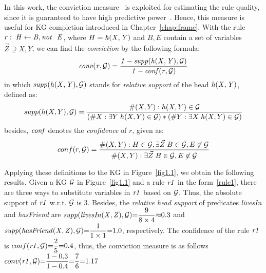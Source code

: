 In this work, the conviction measure~\cite{ref48} is exploited for estimating the rule quality, since it is guaranteed to have high predictive power~\cite{ref46}. Hence, this measure is useful for KG completion introduced in Chapter~\ref{chap:frame}. With the rule $r:\;\mi{H\leftarrow B, \naf\ E}$, where $H=\mathit{h(X,Y)}$ and $B,E$ contain a set of variables $\vec{Z}\supseteq X,Y$, we can find the \emph{conviction} by the following formula:
\vspace{-.26cm}
\begin{equation}
\mathit{conv(r, \mathcal{G})= \dfrac{1 - supp(h(X,Y), \mathcal{G})}{1 - conf(r, \mathcal{G})}}
\end{equation}
in which $\mathit{supp(h(X,Y),\mathcal{G})}$ stands for \textit{relative support} of the head $\mathit{h(X,Y)}$, defined as:
\vspace{-.28cm}
\begin{equation}
supp(h(X,Y),\mathcal{G})=\dfrac{\#(X,Y):h(X,Y)\in \mathcal{G}}{(\#X:\exists Y\;h(X,Y)\in \mathcal{G})*(\#Y:\exists X\;h(X,Y)\in \mathcal{G})}
\end{equation}
besides, $\mathit{conf}$ denotes the \textit{confidence} of $r$, given as:
\begin{equation}
conf(r,\mathcal{G})=\dfrac{\#(X,Y): H \in \mathcal{G}, \exists \vec{Z}\;B\in \mathcal{G},E \not \in \mathcal{G}}{\#(X,Y):\exists \vec{Z}\; B\in \mathcal{G}, E \not \in \mathcal{G}}
\end{equation}
\vspace{-.3cm}

\begin{example}
Applying these definitions to the KG in Figure~\ref{fig1.1}, we obtain the following results. Given a KG $\mathcal{G}$ in Figure~\ref{fig1.1} and a rule $\mathit{r1}$ in the form~\ref{rule1}, there are three ways to substitute variables in $\mathit{r1}$ based on $\mathcal{G}$. Thus, the absolute support of $\mathit{r1}$ w.r.t. $\mathcal{G}$ is $3$. Besides, the \textit{relative head support} of predicates \textit{livesIn} and \textit{hasFriend} are $\mathit{supp(livesIn(X,Z), \mathcal{G})}{=}\dfrac{9}{8 \times 4}{\approx} 0.3$ and  $\mathit{supp(hasFriend(X,Z), \mathcal{G})}{=}\dfrac{1}{1 \times 1}{=} 1.0$, respectively. The confidence of the rule $\mathit{r1}$ is $conf(\mathit{r1}, \mathcal{G}) {=} \dfrac{2}{5} {=} 0.4$, thus, the conviction measure is as follows $conv(\mathit{r1}, \mathcal{G}) {=} \dfrac{1-0.3}{1 - 0.4} {=} \dfrac{7}{6} {=} 1.17$
\end{example}